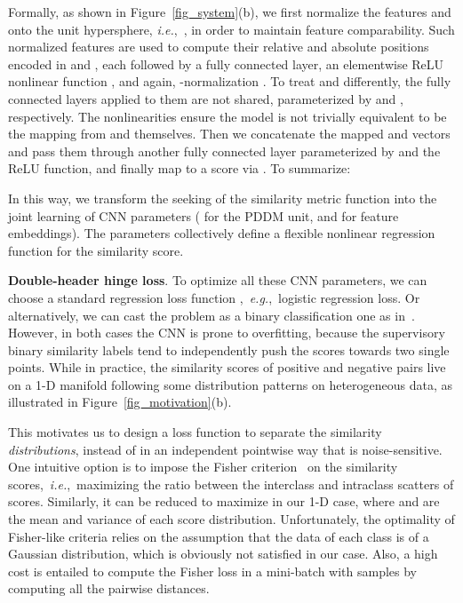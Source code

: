 \documentclass{article}
\newcommand{\eg}{\emph{e.g.}}
\newcommand{\ie}{\emph{i.e.}}
\begin{document}
Formally, as shown in Figure~\ref{fig_system}(b), we first normalize the features  and  onto the unit hypersphere, \ie,~, in order to maintain feature comparability. Such normalized features are used to compute their relative and absolute positions encoded in  and , each followed by a fully connected layer, an elementwise ReLU nonlinear function , and again, -normalization . To treat  and  differently, the fully connected layers applied to them are not shared, parameterized by  and , respectively.
The nonlinearities ensure the model is not trivially equivalent to be the mapping from  and  themselves. Then we concatenate the mapped  and  vectors and pass them through another fully connected layer parameterized by  and the ReLU function, and finally map to a score  via . To summarize:

In this way, we transform the seeking of the similarity metric function  into the joint learning of CNN parameters ( for the PDDM unit, and  for feature embeddings). The parameters collectively define a flexible nonlinear regression function for the similarity score.

\vspace{0.1cm} \noindent
\textbf{Double-header hinge loss}.
To optimize all these CNN parameters, we can choose a standard regression loss function ,~\eg,~logistic regression loss. Or alternatively, we can cast the problem as a binary classification one as in~\cite{XiJoXuKDD2012}. However, in both cases the CNN is prone to overfitting, because the supervisory binary similarity labels  tend to independently push the scores towards two single points. While in practice, the similarity scores of positive and negative pairs live on a 1-D manifold following some distribution patterns on heterogeneous data, as illustrated in Figure~\ref{fig_motivation}(b).


This motivates us to design a loss function  to separate the similarity \emph{distributions}, instead of in an independent pointwise way that is noise-sensitive. One intuitive option is to impose the Fisher criterion~\cite{Martinez2001} on the similarity scores,~\ie,~maximizing the ratio between the interclass and intraclass scatters of scores. Similarly, it can be reduced to maximize  in our 1-D case, where  and  are the mean and variance of each score distribution. Unfortunately, the optimality of Fisher-like criteria relies on the assumption that the data of each class is of a Gaussian distribution, which is obviously not satisfied in our case. Also, a high cost  is entailed to compute the Fisher loss in a mini-batch with  samples by computing all the pairwise distances.
\end{document}
